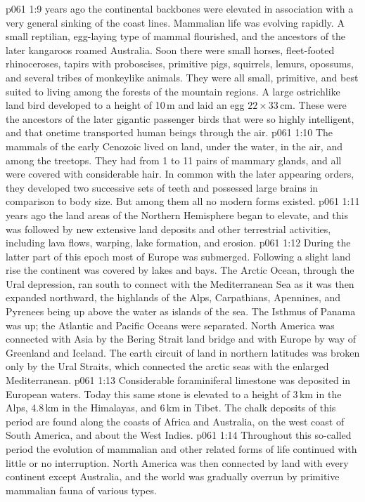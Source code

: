 \vs p061 1:9 \pc {} years ago the continental backbones were elevated in association with a very general sinking of the coast lines. Mammalian life was evolving rapidly. A small reptilian, egg\hyp{}laying type of mammal flourished, and the ancestors of the later kangaroos roamed Australia. Soon there were small horses, fleet\hyp{}footed rhinoceroses, tapirs with proboscises, primitive pigs, squirrels, lemurs, opossums, and several tribes of monkeylike animals. They were all small, primitive, and best suited to living among the forests of the mountain regions. A large ostrichlike land bird developed to a height of 10\,m and laid an egg $22\times 33$\,cm. These were the ancestors of the later gigantic passenger birds that were so highly intelligent, and that onetime transported human beings through the air.
\vs p061 1:10 The mammals of the early Cenozoic lived on land, under the water, in the air, and among the treetops. They had from 1 to 11 pairs of mammary glands, and all were covered with considerable hair. In common with the later appearing orders, they developed two successive sets of teeth and possessed large brains in comparison to body size. But among them all no modern forms existed.
\vs p061 1:11 \pc {} years ago the land areas of the Northern Hemisphere began to elevate, and this was followed by new extensive land deposits and other terrestrial activities, including lava flows, warping, lake formation, and erosion.
\vs p061 1:12 During the latter part of this epoch most of Europe was submerged. Following a slight land rise the continent was covered by lakes and bays. The Arctic Ocean, through the Ural depression, ran south to connect with the Mediterranean Sea as it was then expanded northward, the highlands of the Alps, Carpathians, Apennines, and Pyrenees being up above the water as islands of the sea. The Isthmus of Panama was up; the Atlantic and Pacific Oceans were separated. North America was connected with Asia by the Bering Strait land bridge and with Europe by way of Greenland and Iceland. The earth circuit of land in northern latitudes was broken only by the Ural Straits, which connected the arctic seas with the enlarged Mediterranean.
\vs p061 1:13 Considerable foraminiferal limestone was deposited in European waters. Today this same stone is elevated to a height of 3\,km in the Alps, 4.8\,km in the Himalayas, and 6\,km in Tibet. The chalk deposits of this period are found along the coasts of Africa and Australia, on the west coast of South America, and about the West Indies.
\vs p061 1:14 \pc Throughout this so\hyp{}called  period the evolution of mammalian and other related forms of life continued with little or no interruption. North America was then connected by land with every continent except Australia, and the world was gradually overrun by primitive mammalian fauna of various types.
